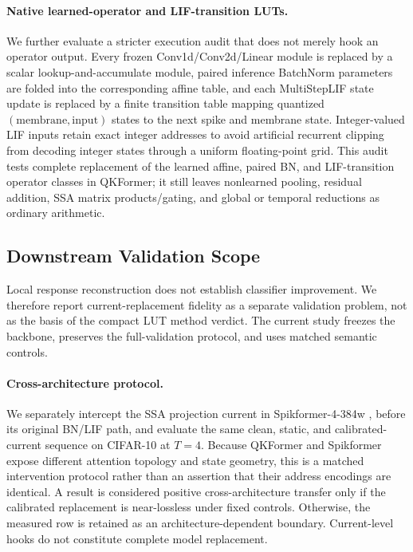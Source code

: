 \paragraph{Native learned-operator and LIF-transition LUTs.}
We further evaluate a stricter execution audit that does not merely hook an
operator output. Every frozen Conv1d/Conv2d/Linear module is replaced by a
scalar lookup-and-accumulate module, paired inference BatchNorm parameters are
folded into the corresponding affine table, and each MultiStepLIF state update
is replaced by a finite transition table mapping quantized
$(\mathrm{membrane},\mathrm{input})$ states to the next spike and membrane
state. Integer-valued LIF inputs retain exact integer addresses to avoid
artificial recurrent clipping from decoding integer states through a uniform
floating-point grid. This audit tests complete replacement of the learned
affine, paired BN, and LIF-transition operator classes in QKFormer; it still
leaves nonlearned pooling, residual addition, SSA matrix products/gating, and
global or temporal reductions as ordinary arithmetic.

\subsection{Downstream Validation Scope}
\label{sec:e3}

Local response reconstruction does not establish classifier improvement. We
therefore report current-replacement fidelity as a separate validation problem,
not as the basis of the compact LUT method verdict. The current study freezes
the backbone, preserves the full-validation protocol, and uses matched semantic
controls.

\paragraph{Cross-architecture protocol.}
We separately intercept the SSA projection current in Spikformer-4-384w
\cite{zhou2023spikformer}, before its original BN/LIF path, and evaluate the
same clean, static, and calibrated-current sequence on CIFAR-10 at $T=4$.
Because QKFormer and Spikformer expose different attention topology and state
geometry, this is a matched intervention protocol rather than an assertion
that their address encodings are identical. A result is considered positive
cross-architecture transfer only if the calibrated replacement is near-lossless
under fixed controls. Otherwise, the measured row is retained as an
architecture-dependent boundary. Current-level hooks do not constitute
complete model replacement.
